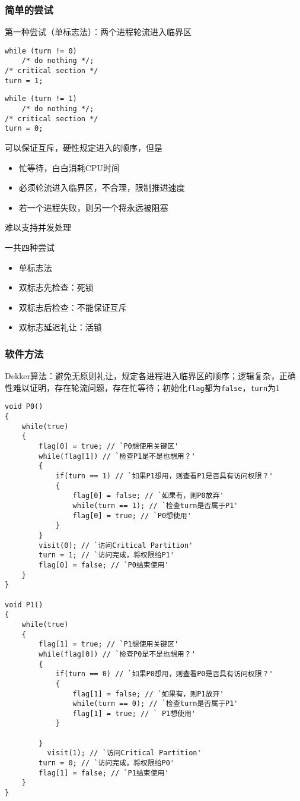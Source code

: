 \subsubsection{简单的尝试}
第一种尝试（单标志法）：两个进程轮流进入临界区

\begin{minipage}{0.5\linewidth}
\begin{lstlisting}
while (turn != 0)
    /* do nothing */;
/* critical section */
turn = 1;
\end{lstlisting}
\end{minipage}
\begin{minipage}{0.5\linewidth}
\begin{lstlisting}
while (turn != 1)
    /* do nothing */;
/* critical section */
turn = 0;
\end{lstlisting}
\end{minipage}

可以保证互斥，硬性规定进入的顺序，但是
\begin{itemize}
    \item 忙等待，白白消耗CPU时间
    \item 必须轮流进入临界区，不合理，限制推进速度
    \item 若一个进程失败，则另一个将永远被阻塞
\end{itemize}
难以支持并发处理

一共四种尝试
\begin{itemize}
    \item 单标志法
    \item 双标志先检查：死锁
    \item 双标志后检查：不能保证互斥
    \item 双标志延迟礼让：活锁
\end{itemize}

\subsubsection{软件方法}
Dekker算法：避免无原则礼让，规定各进程进入临界区的顺序；逻辑复杂，正确性难以证明，存在轮流问题，存在忙等待；初始化\verb'flag'都为\verb'false'，\verb'turn'为1
\begin{lstlisting}
void P0()
{
	while(true)
	{
		flag[0] = true; // `P0想使用关键区'
		while(flag[1]) // `检查P1是不是也想用？'
		{
			if(turn == 1) // `如果P1想用，则查看P1是否具有访问权限？'
			{
				flag[0] = false; // `如果有，则P0放弃'
				while(turn == 1); // `检查turn是否属于P1'
				flag[0] = true; // `P0想使用'
			}
		}
		visit(0); // `访问Critical Partition'
		turn = 1; // `访问完成，将权限给P1'
		flag[0] = false; // `P0结束使用'
	}
}

void P1()
{
	while(true)
	{
		flag[1] = true; // `P1想使用关键区'
		while(flag[0]) // `检查P0是不是也想用？'
		{
			if(turn == 0) // `如果P0想用，则查看P0是否具有访问权限？'
			{
				flag[1] = false; // `如果有，则P1放弃'
				while(turn == 0); // `检查turn是否属于P1'
				flag[1] = true; // ` P1想使用'
			}

		}
		  visit(1); // `访问Critical Partition'
		turn = 0; // `访问完成，将权限给P0'
		flag[1] = false; // `P1结束使用'
	}
}
\end{lstlisting}

